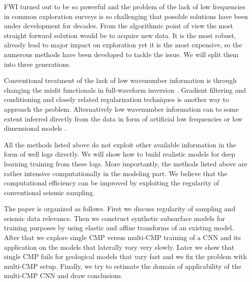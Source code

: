 \documentclass[manuscript]{geophysics}
\begin{document}
 FWI turned out to be so powerful and the problem of the lack of low frequencies in common exploration surveys is so challenging that possible solutions have been under development for decades. From the algorithmic point of view the most straight forward solution would be to acquire new data. It is the most robust, already lead to major impact on exploration \citep{fons2013,bpGOM_discovery} yet it is the most expensive, so the numerous methods have been developed to tackle the issue. We will split them into three generations.

Conventional treatment of the lack of low wavenumber information is through changing the misfit functionals in full-waveform inversion \citep[e.g.][]{luo1991wave, bozdag2011, choi2012, leeuwen2013}. 
Gradient filtering and conditioning \citep{ravaut2004multiscale, alkhalifah2015full, kazei2016, ovcharenko2018, ruan2018global} and closely related regularization techniques \citep{esserTotalvariationRegularizationStrategies2016, kazei2017TL, kazeiSaltbodyInversionMinimum2017, operto2018role, kalita2019regularized} is another way to approach the problem.
Alternatively low wavenumber information can to some extent inferred directly from the data in form of artificial low frequencies \citep{ovcharenkoNeuralNetworkBased2017,ovcharenkoLowFrequencyDataExtrapolation2018, ovcharenko2019deep, jin2018learn, kazei2019realistically} or low dimensional models \citep[e.g.][]{polo2018}.

All the methods listed above do not exploit other available information in the form of well logs directly.
We will show how to build realistic models for deep learning training from these logs. 
More importantly, the methods listed above are rather intensive computationally in the modeling part.
We believe that the computational efficiency can be improved by exploiting the regularity of conventional seismic sampling.

The paper is organized as follows. First we discuss regularity of sampling and seismic data relevance.
%
Then we construct synthetic subsurface models for training purposes by using elastic and affine transforms of an existing model.
%
After that we explore single CMP versus multi-CMP training of a CNN and its application on the models that laterally vary very slowly.
%
Later we show that single CMP fails for geological models that vary fast and we fix the problem with multi-CMP setup.
%
Finally, we try to estimate the domain of applicability of the multi-CMP CNN and draw conclusions.
\end{document}

